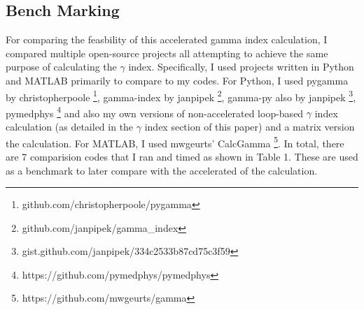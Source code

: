 \documentclass[12pt]{article}
\begin{document}
\subsection{Bench Marking}
For comparing the feasbility of this accelerated gamma index calculation, I compared multiple open-source projects all attempting to achieve the same purpose of calculating the $\gamma$ index. Specifically, I used projects written in Python and MATLAB primarily to compare to my codes. For Python, I used pygamma by christopherpoole \footnote[1]{github.com/christopherpoole/pygamma}, gamma-index by janpipek \footnote[2]{github.com/janpipek/gamma\_index}, gamma-py also by janpipek \footnote[3]{gist.github.com/janpipek/334c2533b87cd75c3f59}, pymedphys \footnote[5]{https://github.com/pymedphys/pymedphys} and also my own versions of non-accelerated loop-based $\gamma$ index calculation (as detailed in the $\gamma$ index section of this paper) and a matrix version the calculation. For MATLAB, I used mwgeurts' CalcGamma \footnote[5]{https://github.com/mwgeurts/gamma}. In total, there are 7 comparision codes that I ran and timed as shown in Table 1. These are used as a benchmark to later compare with the accelerated of the calculation.


\pagebreak
\printbibliography
\end{document}
